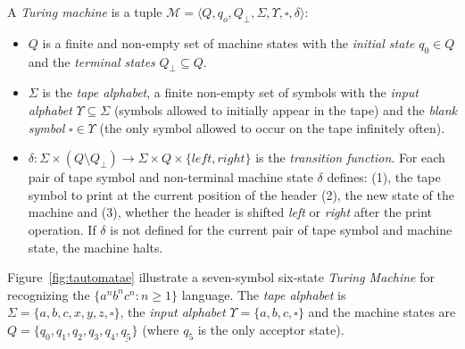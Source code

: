 \documentclass[letterpaper]{article} %
\newcommand{\tup}[1]{{\langle #1 \rangle}}
\begin{document}
A {\em Turing machine} is a tuple $\mathcal{M}=\tup{Q,q_o,Q_{\bot},\Sigma,\Upsilon,\square,\delta}$:
\begin{itemize}
\item $Q$ is a finite and non-empty set of machine states with the {\em initial state} $q_0\in Q$ and the {\em terminal states} $Q_{\bot}\subseteq Q$.  
\item $\Sigma$ is the {\em tape alphabet}, a finite non-empty set of symbols with the {\em input alphabet} $\Upsilon\subseteq\Sigma$ (symbols allowed to initially appear in the tape) and the {\em blank symbol} $\square\in\Upsilon$ (the only symbol allowed to occur on the tape infinitely often).
\item $\delta: \Sigma\times (Q\setminus Q_{\bot}) \rightarrow \Sigma\times Q\times\{left,right\}$ is the {\em transition function}. For each pair of tape symbol and non-terminal machine state $\delta$ defines: (1), the tape symbol to print at the current position of the header (2), the new state of the machine and (3), whether the header is shifted {\em left} or {\em right} after the print operation. If $\delta$ is not defined for the current pair of tape symbol and machine state, the machine halts.
\end{itemize}

Figure~\ref{fig:tautomatae} illustrate a seven-symbol six-state {\em Turing Machine} for recognizing the $\{a^nb^nc^n : n \geq 1 \}$ language. The {\em tape alphabet} is $\Sigma=\{a,b,c,x,y,z,\square\}$, the {\em input alphabet} $\Upsilon=\{a,b,c,\square\}$ and the machine states are $Q=\{q_0,q_1,q_2,q_3,q_4,\underline{q_5}\}$ (where \underline{$q_5$} is the only acceptor state).
\end{document}
